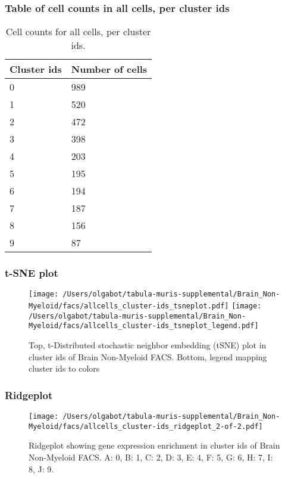 \subsubsection{Table of cell counts in all cells, per cluster ids}\begin{table}[h]
\centering
\label{my-label}
\begin{tabular}{@{}ll@{}}
\toprule

Cluster ids& Number of cells \\ \midrule
0 & 989 \\

1 & 520 \\

2 & 472 \\

3 & 398 \\

4 & 203 \\

5 & 195 \\

6 & 194 \\

7 & 187 \\

8 & 156 \\

9 & 87 \\
\bottomrule
\end{tabular}
\caption{Cell counts for all cells, per cluster ids.}
\end{table}

\newpage
\subsubsection{t-SNE plot}
\begin{figure}[h]
\centering
\texttt{[image: /Users/olgabot/tabula-muris-supplemental/Brain\_Non-Myeloid/facs/allcells\_cluster-ids\_tsneplot.pdf]}
\texttt{[image: /Users/olgabot/tabula-muris-supplemental/Brain\_Non-Myeloid/facs/allcells\_cluster-ids\_tsneplot\_legend.pdf]}
\caption{Top, t-Distributed stochastic neighbor embedding (tSNE) plot  in cluster ids of Brain Non-Myeloid FACS. Bottom, legend mapping cluster ids to colors}
\end{figure}


\newpage
\newpage
\subsubsection{Ridgeplot}
\begin{figure}[h]
\centering
\texttt{[image: /Users/olgabot/tabula-muris-supplemental/Brain\_Non-Myeloid/facs/allcells\_cluster-ids\_ridgeplot\_2-of-2.pdf]}

\caption{ Ridgeplot  showing gene expression enrichment in cluster ids of Brain Non-Myeloid FACS. A: 0, B: 1, C: 2, D: 3, E: 4, F: 5, G: 6, H: 7, I: 8, J: 9.}
\end{figure}


